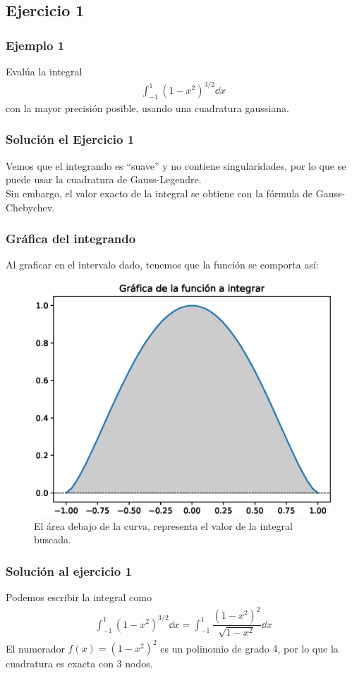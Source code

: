 \subsection*{Ejercicio 1}
\begin{frame}
\frametitle{Ejemplo 1}
Evalúa la integral
\begin{align*}
\int_{-1}^{1} (1 - x^{2})^{3/2}  \dd{x}
\end{align*}
con la mayor precisión posible, usando una cuadratura gaussiana.
\end{frame}
\begin{frame}
\frametitle{Solución el Ejercicio 1}
Vemos que el integrando es \enquote{suave} y no contiene singularidades, por lo que se puede usar la cuadratura de Gauss-Legendre.
\\
\bigskip
\pause
Sin embargo, el valor exacto de la integral se obtiene con la fórmula de Gauss-Chebychev.
\end{frame}
\begin{frame}
\frametitle{Gráfica del integrando}
Al graficar en el intervalo dado, tenemos que la función se comporta así:
\begin{figure}
	\centering
	\includegraphics[scale=0.35]{Imagenes/cuadratura_01.eps}
	\caption{El área debajo de la curva, representa el valor de la integral buscada.}
\end{figure}
\end{frame}
\begin{frame}
\frametitle{Solución al ejercicio 1}
Podemos escribir la integral como
\begin{align*}
\int_{-1}^{1} (1 - x^{2})^{3/2} \dd{x} = \int_{-1}^{1} \dfrac{(1 -x ^{2})^{2}}{\sqrt{1 - x^{2}}} \dd{x}
\end{align*}
\pause
El numerador $f(x) = (1 - x^{2})^{2}$ es un polinomio de grado $4$, por lo que la cuadratura es exacta con $3$ nodos.
\end{frame}
